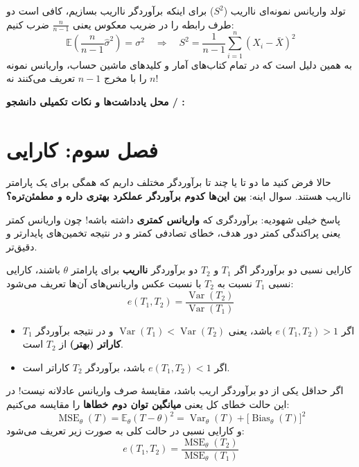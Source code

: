\documentclass[12pt,a4paper,oneside]{report}
\newcommand{\notespace}{%
  \par\vspace{8pt}%
  \begin{tcolorbox}[breakable=false,colback=white,colframe=muted!50,boxrule=.6pt,arc=1.5mm,height=0.36\textheight]
    \textcolor{muted!70}{\small\textbf{محل یادداشت‌ها و نکات تکمیلی دانشجو / \lr{TA}:}}
  \end{tcolorbox}%
  \par\vspace{8pt}%
}
\newcommand{\E}{\mathbb E}
\newcommand{\Var}{\operatorname{Var}}
\newcommand{\MSE}{\operatorname{MSE}}
\newcommand{\Bias}{\operatorname{Bias}}
\begin{document}
\begin{result}{تولد واریانس نمونه‌ای نااریب ($S^2$)}
برای اینکه برآوردگر نااریب بسازیم، کافی است دو طرف رابطه را در ضریب معکوس یعنی $\frac{n}{n-1}$ ضرب کنیم:
\[
\E\!\left(\frac{n}{n-1} \hat{\sigma}^2\right) = \sigma^2 \quad\Longrightarrow\quad \boxed{S^2 = \frac{1}{n-1}\sum_{i=1}^n (X_i - \bar{X})^2}
\]
به همین دلیل است که در تمام کتاب‌های آمار و کلیدهای ماشین حساب، واریانس نمونه را با مخرج $n-1$ تعریف می‌کنند نه $n$!
\end{result}

\notespace

\clearpage
\chapter*{فصل سوم: کارایی }

حالا فرض کنید ما دو تا یا چند تا برآوردگر مختلف داریم که همگی برای یک پارامتر نااریب هستند. سوال اینه: \textbf{بین این‌ها کدوم برآوردگر عملکرد بهتری داره و مطمئن‌تره؟}

پاسخ خیلی شهودیه: برآوردگری که \textbf{واریانس کمتری} داشته باشه! چون واریانس کمتر یعنی پراکندگی کمتر دور هدف، خطای تصادفی کمتر و در نتیجه تخمین‌های پایدارتر و دقیق‌تر.

\begin{definition}{کارایی نسبی دو برآوردگر }
اگر $T_1$ و $T_2$ دو برآوردگر \textbf{نااریب} برای پارامتر $\theta$ باشند، کارایی نسبی $T_1$ نسبت به $T_2$ با نسبت عکس واریانس‌های آن‌ها تعریف می‌شود:
\[
e(T_1, T_2) = \frac{\Var(T_2)}{\Var(T_1)}
\]
\begin{itemize}[itemsep=2pt]
\item اگر $e(T_1, T_2) > 1$ باشد، یعنی $\Var(T_1) < \Var(T_2)$ و در نتیجه برآوردگر $T_1$ \textbf{کاراتر (بهتر)} از $T_2$ است.
\item اگر $e(T_1, T_2) < 1$ باشد، برآوردگر $T_2$ کاراتر است.
\end{itemize}
\end{definition}

\begin{reminder}
اگر حداقل یکی از دو برآوردگر اریب باشد، مقایسهٔ صرف واریانس عادلانه نیست! در این حالت خطای کل یعنی \textbf{میانگین توان دوم خطاها } را مقایسه می‌کنیم:
\[
\MSE_\theta(T) = \E_\theta(T - \theta)^2 = \Var_\theta(T) + \big[\Bias_\theta(T)\big]^2
\]
و کارایی نسبی در حالت کلی به صورت زیر تعریف می‌شود:
\[
e(T_1, T_2) = \frac{\MSE_\theta(T_2)}{\MSE_\theta(T_1)}
\]
\end{reminder}
\end{document}
